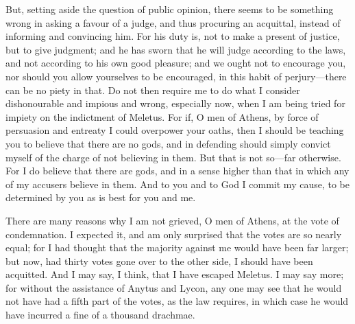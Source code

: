 \documentclass[11pt,letter]{article}
\begin{document}
\par  But, setting aside the question of public opinion, there seems to be something wrong in asking a favour of a judge, and thus procuring an acquittal, instead of informing and convincing him. For his duty is, not to make a present of justice, but to give judgment; and he has sworn that he will judge according to the laws, and not according to his own good pleasure; and we ought not to encourage you, nor should you allow yourselves to be encouraged, in this habit of perjury—there can be no piety in that. Do not then require me to do what I consider dishonourable and impious and wrong, especially now, when I am being tried for impiety on the indictment of Meletus. For if, O men of Athens, by force of persuasion and entreaty I could overpower your oaths, then I should be teaching you to believe that there are no gods, and in defending should simply convict myself of the charge of not believing in them. But that is not so—far otherwise. For I do believe that there are gods, and in a sense higher than that in which any of my accusers believe in them. And to you and to God I commit my cause, to be determined by you as is best for you and me.

\par  There are many reasons why I am not grieved, O men of Athens, at the vote of condemnation. I expected it, and am only surprised that the votes are so nearly equal; for I had thought that the majority against me would have been far larger; but now, had thirty votes gone over to the other side, I should have been acquitted. And I may say, I think, that I have escaped Meletus. I may say more; for without the assistance of Anytus and Lycon, any one may see that he would not have had a fifth part of the votes, as the law requires, in which case he would have incurred a fine of a thousand drachmae.
\end{document}
